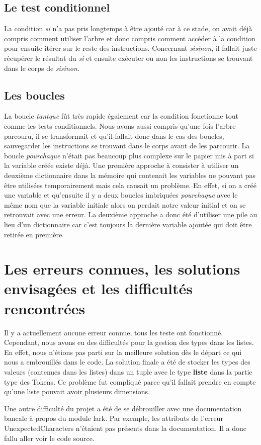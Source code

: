 \subsection{Le test conditionnel}
La condition \textit{si} n'a pas pris longtemps à être ajouté car à ce stade, on avait déjà compris comment utiliser l'arbre et
donc compris comment accéder à la condition pour ensuite itérer sur le reste des instructions. 
Concernant \textit{sisinon}, il fallait juste récupérer le résultat du \textit{si} et ensuite exécuter ou non
les instructions se trouvant dans le corps de \textit{sisinon}.

\subsection{Les boucles}
La boucle \textit{tantque} fût très rapide également car la condition fonctionne tout comme les tests conditionnels.
Nous avons aussi compris qu'une fois l'arbre parcouru, il se transformait et qu'il fallait donc dans le cas des boucles,
sauvegarder les instructions se trouvant dans le corps avant de les parcourir.
La boucle \textit{pourchaque} n'était pas beaucoup plus complexe sur le papier mis à part si la variable créée existe déjà.
Une première approche à consister à utiliser un deuxième dictionnaire dans la mémoire qui contenait les variables ne pouvant pas être utilisées temporairement
mais cela causait un problème.
En effet, si on a créé une variable et qu'ensuite il y a deux boucles imbriquées \textit{pourchaque} avec le même nom que la variable initiale
alors on perdait notre valeur initial et on se retrouvait avec une erreur.
La deuxième approche a donc été d'utiliser une pile au lieu d'un dictionnaire car c'est toujours la dernière variable ajoutée qui doit être retirée en première.

\section{Les erreurs connues, les solutions envisagées et les difficultés rencontrées}
Il y a actuellement aucune erreur connue, tous les teste ont fonctionné. Cependant, nous avons eu des difficultés pour la gestion des types dans les listes.
En effet, nous n'étions pas parti sur la meilleure solution dès le départ ce qui nous a embrouillés dans le code.
La solution finale a été de stocker les types des valeurs (contenues dans les listes) dans un tuple avec le type \textbf{liste} dans la partie type des Tokens.
Ce problème fut compliqué parce qu'il fallait prendre en compte qu'une liste pouvait avoir plusieurs dimensions.

Une autre difficulté du projet a été de se débrouiller avec une documentation bancale à propos du module lark.
Par exemple, les attributs de l'erreur UnexpectedCharacters n'étaient pas présents dans la documentation. Il a donc fallu aller voir le code source.
